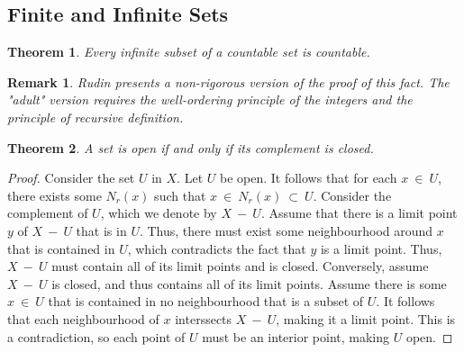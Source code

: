 \documentclass[10pt, oneside]{article}
\newtheorem{thm}{Theorem}
\newtheorem{rem}{Remark}
\begin{document}
\subsection{Finite and Infinite Sets}

\begin{thm}
	Every infinite subset of a countable set is countable.
\end{thm}

\begin{rem}
	Rudin presents a non-rigorous version of the proof of this fact. The "adult" version requires the well-ordering principle
	of the integers and the principle of recursive definition.
\end{rem}

\begin{thm}
	A set is open if and only if its complement is closed.
\end{thm}

\begin{proof}
	Consider the set $U$ in $X$. Let $U$ be open. It follows that for each $x \ \in \ U$, there exists some $N_r(x)$ such that 
	$x \ \in \ N_r(x) \ \subset \ U$. Consider the complement of $U$, which we denote by $X \ - \ U$. Assume that there is a 
	limit point $y$ of $X \ - \ U$ that is in $U$. Thus, there must exist some neighbourhood around $x$ that is contained in 
	$U$, which contradicts the fact that $y$ is a limit point. Thus, $X \ - \ U$ must contain all of its limit points and 
	is closed.
	\newline\newline
	Conversely, assume $X \ - \ U$ is closed, and thus contains all of its limit points. Assume there is some $x \ \in \ U$ 
	that is contained in no neighbourhood that is a subset of $U$. It follows that each neighbourhood of $x$ interssects 
	$X \ - \ U$, making it a limit point. This is a contradiction, so each point of $U$ must be an interior point, making 
	$U$ open.
\end{proof}
\end{document}
